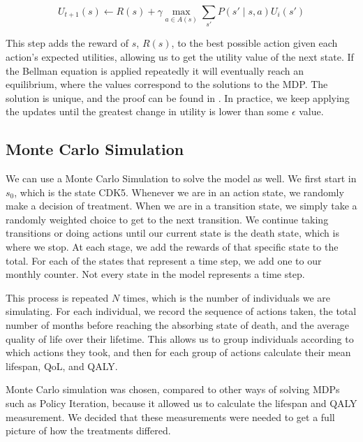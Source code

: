 \documentclass[10pt,twocolumn]{article}
\begin{document}
\small
\begin{equation*}
 U_{t+1}(s) \leftarrow R(s) + \gamma \max_{a \in A(s)} \sum_{s'} P(s' \mid s, a)U_i(s')
\end{equation*}

This step adds the reward of \(s\), \(R(s)\), to the best possible action given each action's expected utilities, allowing us to get the utility value of the next state. If the Bellman equation is applied repeatedly it will eventually reach an equilibrium, where the values correspond to the solutions to the MDP. The solution is unique, and the proof can be found in \cite{ai}. In practice, we keep applying the updates until the greatest change in utility is lower than some \(\epsilon\) value.

\subsection{Monte Carlo Simulation}

We can use a Monte Carlo Simulation to solve the model as well. We first start in \(s_0\), which is the state CDK5. Whenever we are in an action state, we randomly make a decision of treatment. When we are in a transition state, we simply take a randomly weighted choice to get to the next transition. We continue taking transitions or doing actions until our current state is the death state, which is where we stop. At each stage, we add the rewards of that specific state to the total. For each of the states that represent a time step, we add one to our monthly counter. Not every state in the model represents a time step.

This process is repeated \(N\) times, which is the number of individuals we are simulating. For each individual, we record the sequence of actions taken, the total number of months before reaching the absorbing state of death, and the average quality of life over their lifetime. This allows us to group individuals according to which actions they took, and then for each group of actions calculate their mean lifespan, QoL, and QALY. 

Monte Carlo simulation was chosen, compared to other ways of solving MDPs such as Policy Iteration, because it allowed us to calculate the lifespan and QALY measurement. We decided that these measurements were needed to get a full picture of how the treatments differed. 

\end{document}
